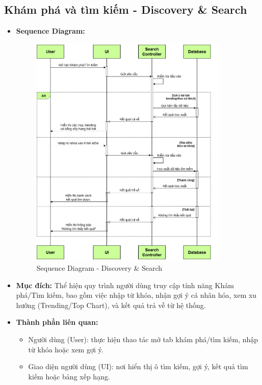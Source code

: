 \documentclass[a4paper]{article}
\begin{document}
\subsection{Khám phá và tìm kiếm - Discovery \& Search}
\begin{itemize}
	\item \textbf{Sequence Diagram:}
	      \begin{figure}[H]
				\centering
				\includegraphics[width=0.9\textwidth, height=0.7\textheight]{Images/discover-search_sequence.png}
				\caption{Sequence Diagram - Discovery \& Search}
	      \end{figure}
	\item \textbf{Mục đích:} Thể hiện quy trình người dùng truy cập tính năng Khám phá/Tìm kiếm, bao gồm việc nhập từ khóa, nhận gợi ý cá nhân hóa, xem xu hướng (Trending/Top Chart), và kết quả trả về từ hệ thống.
	\item \textbf{Thành phần liên quan:}
	      \begin{itemize}
		      \item Người dùng (User): thực hiện thao tác mở tab khám phá/tìm kiếm, nhập từ khóa hoặc xem gợi ý.
		      \item Giao diện người dùng (UI): nơi hiển thị ô tìm kiếm, gợi ý, kết quả tìm kiếm hoặc bảng xếp hạng.

\end{itemize}
\end{itemize}
\end{document}
